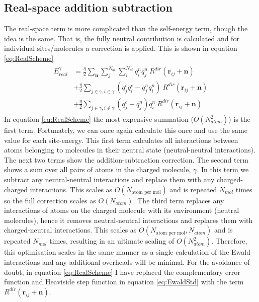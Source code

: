 \subsection{Real-space addition subtraction}
The real-space term is more complicated than the self-energy term, though the idea is the same. That is, the fully neutral contribution is calculated and for individual sites/molecules a correction is applied. This is shown in equation \eqref{eq:RealScheme}
\begin{eqnarray}
  \begin{split}
	  E^{\gamma}_{real} &= \frac{\eta}{2} \sum_{\mathbf{n}} \sum_{j}^{N_{at}} \sum_{i}^{N_{at}} q^{n}_i q^{n}_j  \ R^{dir}(\mathbf{r}_{ij} + \mathbf{n}) \\
	  &+ \frac{\eta}{2}\sum_{j \in \gamma, i \in \gamma} (q_j^c q_i^c - q_j^n q_i^n) \ R^{dir}(\mathbf{r}_{ij} + \mathbf{n}) \\
	  &+ \frac{\eta}{2}\sum_{j \in \gamma, i \not\in \gamma} (q_j^c - q_j^n)q_i^n \ R^{dir}(\mathbf{r}_{ij} + \mathbf{n}) 
  \end{split}
  \label{eq:RealScheme}
\end{eqnarray}
In equation \eqref{eq:RealScheme} the most expensive summation ($O(N_{atom}^2)$) is the first term. Fortunately, we can once again calculate this once and use the same value for each site-energy. This first term calculates all interactions between atoms belonging to molecules in their neutral state (neutral-neutral interactions). The next two terms show the addition-subtraction correction. The second term shows a sum over all pairs of atoms in the charged molecule, $\gamma$. In this term we subtract any neutral-neutral interactions and replace them with any charged-charged interactions. This scales as $O(N_{\text{atom per mol}})$ and is repeated $N_{mol}$ times so the full correction scales as $O(N_{atom})$. The third term replaces any interactions of atoms on the charged molecule with its environment (neutral molecules), hence it removes neutral-neutral interactions and replaces them with charged-neutral interactions. This scales as $O(N_{\text{atom per mol}}, N_{atom})$ and is repeated $N_{mol}$ times, resulting in an ultimate scaling of $O(N_{atom}^2)$. Therefore, this optimisation scales in the same manner as a single calculation of the Ewald interactions and any additional overheads will be minimal. For the avoidance of doubt, in equation \eqref{eq:RealScheme} I have replaced the complementary error function and Heaviside step function in equation \eqref{eq:EwaldStd} with the term $R^{dir}(\mathbf{r}_{ij} + \mathbf{n})$.
